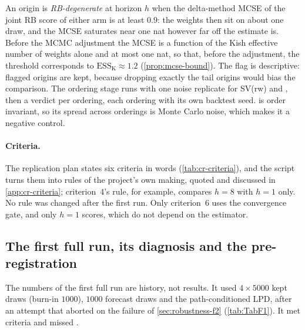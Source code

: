 An origin is \emph{RB-degenerate} at horizon $h$ when the delta-method MCSE of the joint RB score of
either arm is at least $0.9$: the weights then sit on about one draw, and the MCSE saturates near
one nat however far off the estimate is. Before the MCMC adjustment the MCSE is a function of the
Kish effective number of weights alone and at most one nat, so that, before the adjustment, the
threshold corresponds to $\mathrm{ESS}_{\mathrm{K}} \approx 1.2$ (\cref{prop:mcse-bound}). %
The flag is descriptive: flagged origins are kept, because dropping exactly the tail origins would
bias the comparison. The ordering stage runs  with one noise replicate for SV(rw) and , then a 
verdict per ordering, each ordering with its own backtest seed. %
 is order invariant, so its spread across orderings is Monte Carlo
noise, which makes it a negative control.

\paragraph{Criteria.}\label{sec:replication-criteria}
The replication plan states six criteria in words (\cref{tab:cr-criteria}), and the script turns
them into rules of the project's own making, quoted and discussed in \cref{app:cr-criteria};
criterion~4's rule, for example, compares $h = 8$ with $h = 1$ only. No rule was changed after the
first run. Only criterion~6 uses the convergence gate, and only $h = 1$ scores, which do not depend
on the estimator. %


\subsection{The first full run, its diagnosis and the pre-registration}\label{sec:replication-first-run}\label{sec:replication-prereg}

The numbers of the first full run are history, not results. It used $4 \times 5000$ kept draws
(burn-in $1000$), $1000$ forecast draws and the path-conditioned LPD, after an attempt that aborted
on the failure of \cref{sec:robustness-f2} (\cref{tab:TabF1}). It met criteria
 and missed .

